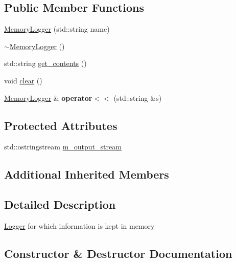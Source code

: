 \subsection*{Public Member Functions}
\begin{DoxyCompactItemize}
\item 
\hyperlink{classez_1_1logging_1_1MemoryLogger_a721c1b62885a86e68819cb931c925f75}{Memory\+Logger} (std\+::string name)
\item 
\hyperlink{classez_1_1logging_1_1MemoryLogger_a421c0b502e122f86d5c5fbfa1660d6ee}{$\sim$\+Memory\+Logger} ()
\item 
std\+::string \hyperlink{classez_1_1logging_1_1MemoryLogger_aa4f77cc6ac0e272ce749b9bb4b939840}{get\+\_\+contents} ()
\item 
void \hyperlink{classez_1_1logging_1_1MemoryLogger_afa6c630d5e6334495f05727cdb7c3b16}{clear} ()
\item 
\mbox{\label{classez_1_1logging_1_1MemoryLogger_a31cc1a88c8ee64447268ce7f46b042a1}} 
\hyperlink{classez_1_1logging_1_1MemoryLogger}{Memory\+Logger} \& {\bfseries operator$<$$<$} (std\+::string \&s)
\end{DoxyCompactItemize}
\subsection*{Protected Attributes}
\begin{DoxyCompactItemize}
\item 
std\+::ostringstream \hyperlink{classez_1_1logging_1_1MemoryLogger_a45fc2a111c72be27408aef6c7a466dc0}{m\+\_\+output\+\_\+stream}
\end{DoxyCompactItemize}
\subsection*{Additional Inherited Members}


\subsection{Detailed Description}
\hyperlink{classez_1_1logging_1_1Logger}{Logger} for which information is kept in memory 

\subsection{Constructor \& Destructor Documentation}
\mbox{\label{classez_1_1logging_1_1MemoryLogger_a721c1b62885a86e68819cb931c925f75}} 
